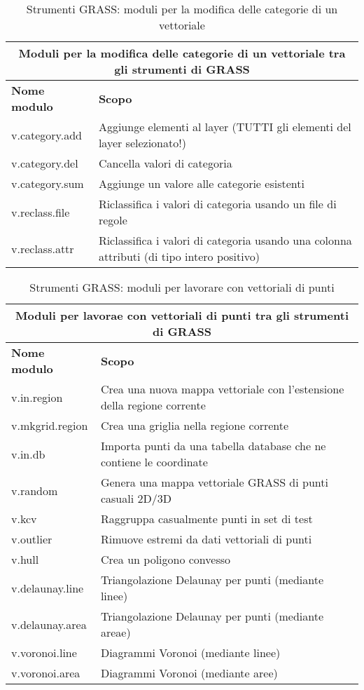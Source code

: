 \begin{table}[ht]
\centering
\caption{Strumenti GRASS: moduli per la modifica delle categorie di un vettoriale}\medskip
 \begin{tabular}{|p{4cm}|p{12cm}|}
  \hline \multicolumn{2}{|c|}{\textbf{Moduli per la modifica delle categorie di un vettoriale tra gli strumenti di GRASS}} \\
  \hline \textbf{Nome modulo} & \textbf{Scopo} \\
  \hline v.category.add & Aggiunge elementi al layer (TUTTI gli elementi del layer selezionato!) \\
  \hline v.category.del & Cancella valori di categoria \\
  \hline v.category.sum & Aggiunge un valore alle categorie esistenti \\
  \hline v.reclass.file & Riclassifica i valori di categoria usando un file di regole \\
  \hline v.reclass.attr & Riclassifica i valori di categoria usando una colonna attributi (di tipo intero positivo) \\
\hline
\end{tabular}
\end{table}

\begin{table}[ht]
\centering
\caption{Strumenti GRASS: moduli per lavorare con vettoriali di punti}\medskip
 \begin{tabular}{|p{4cm}|p{12cm}|}
  \hline \multicolumn{2}{|c|}{\textbf{Moduli per lavorae con vettoriali di punti tra gli strumenti di GRASS}} \\
  \hline \textbf{Nome modulo} & \textbf{Scopo} \\
  \hline v.in.region & Crea una nuova mappa vettoriale con l'estensione della regione corrente \\
  \hline v.mkgrid.region & Crea una griglia nella regione corrente \\
  \hline v.in.db & Importa punti da una tabella database che ne contiene le coordinate \\
  \hline v.random & Genera una mappa vettoriale GRASS di punti casuali 2D/3D \\
  \hline v.kcv & Raggruppa casualmente punti in set di test \\
  \hline v.outlier & Rimuove estremi da dati vettoriali di punti \\
  \hline v.hull & Crea un poligono convesso \\
  \hline v.delaunay.line & Triangolazione Delaunay per punti (mediante linee) \\
  \hline v.delaunay.area & Triangolazione Delaunay per punti (mediante areae) \\
  \hline v.voronoi.line & Diagrammi Voronoi (mediante linee) \\
  \hline v.voronoi.area & Diagrammi Voronoi (mediante aree) \\
\hline
\end{tabular}
\end{table}

